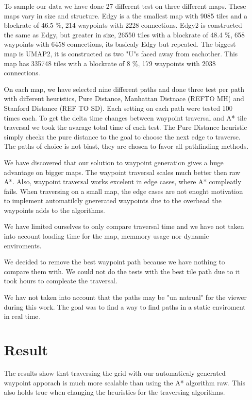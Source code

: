 \documentclass[a4paper]{article}
\begin{document}
To sample our data we have done 27 different test on three different maps. These maps vary in size and structure. Edgy is a the smallest map with 9085 tiles and a blockrate of 46.5 \%, 214 waypoints with 2228 connections. Edgy2 is constructed the same as Edgy, but greater in size, 26550 tiles with a blockrate of 48.4 \%, 658 waypoints with 6458 connections, its basicaly Edgy but repeated. The biggest map is UMAP2, it is constructed as two "U"s faced away from eachother. This map has 335748 tiles with a blockrate of 8 \%, 179 waypoints with 2038 connections.

On each map, we have selected nine different paths and done three test per path with different heuristics, Pure Distance, Manhattan Distnace (REFTO MH) and Stanford Distance (REF TO SD).
Each setting on each path were tested 100 times each. To get the delta time changes between waypoint traversal and A* tile traversal we took the avarage total time of each test.
The Pure Distance heuristic simply checks the pure distance to the goal to choose the next edge to traverse. The paths of choice is not biast, they are chosen to favor all pathfinding methods.

We have discovered that our solution to waypoint generation gives a huge advantage on bigger maps. The waypoint traversal scales much better then raw A*. Also, waypoint traversal works excelent in edge cases, where A* compleatly fails.
When traversing on a small map, the edge cases are not enoght motivation to implement automatilcly gnererated waypoints due to the overhead the waypoints adds to the algorithms.

We have limited ourselves to only compare traversal time and we have not taken into account loading time for the map, memmory usage nor dynamic enviroments.
	
We decided to remove the best waypoint path because we have nothing to compare them with. We could not do the tests with the best tile path due to it took hours to compleate the traversal.
	
We hav not taken into account that the paths may be "un natrual" for the viewer during this work. The goal was to find a way to find paths in a static enviroment in real time.

\section{Result}

The results show that traversing the grid with our automaticaly generated waypoint apporach is much more scalable than using the A* algorithm raw. This also holds true when changing the heuristics for the traversing algorithms.
	
\end{document}

